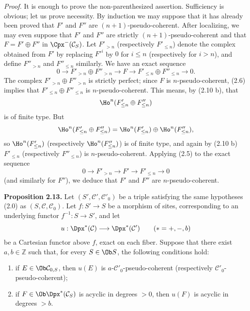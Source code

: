 \documentclass[11pt]{article}
\begin{document}
\emph{Proof.} It is enough to prove the non-parenthesized assertion. Sufficiency is obvious; let us prove necessity. By induction we may suppose that it has already been proved that \(F'\) and \(F''\) are \((n+1)\)-pseudo-coherent. After localizing, we may even suppose that \(F'\) and \(F''\) are strictly \((n+1)\)-pseudo-coherent and that \(F=F'\oplus F''\) in \(\Cpx^-(\mathcal C_S)\). Let \(F'_{>n}\) (respectively \(F'_{\leq n}\)) denote the complex obtained from \(F'\) by replacing \(F'^i\) by \(0\) for \(i\leq n\) (respectively for \(i>n\)), and define \(F''_{>n}\) and \(F''_{\leq n}\) similarly. We have an exact sequence
\[
  0\longrightarrow F'_{>n}\oplus F''_{>n}\longrightarrow F
  \longrightarrow F'_{\leq n}\oplus F''_{\leq n}\longrightarrow 0 .
\]
The complex \(F'_{>n}\oplus F''_{>n}\) is strictly perfect; since \(F\) is \(n\)-pseudo-coherent, (2.6) implies that \(F'_{\leq n}\oplus F''_{\leq n}\) is \(n\)-pseudo-coherent. This means, by (2.10 b), that
\[
  \Ho^n(F'_{\leq n}\oplus F''_{\leq n})
\]
is of finite type. But
\[
  \Ho^n(F'_{\leq n}\oplus F''_{\leq n})
  =\Ho^n(F'_{\leq n})\oplus \Ho^n(F''_{\leq n}),
\]
so \(\Ho^n(F'_{\leq n})\) (respectively \(\Ho^n(F''_{\leq n})\)) is of finite type, and again by (2.10 b) \(F'_{\leq n}\) (respectively \(F''_{\leq n}\)) is \(n\)-pseudo-coherent. Applying (2.5) to the exact sequence
\[
  0\longrightarrow F'_{>n}\longrightarrow F'\longrightarrow F'_{\leq n}\longrightarrow 0
\]
(and similarly for \(F''\)), we deduce that \(F'\) and \(F''\) are \(n\)-pseudo-coherent.

\textbf{Proposition 2.13.} Let \((S',\mathcal C',\mathcal C'_0)\) be a triple satisfying the same hypotheses (2.0) as \((S,\mathcal C,\mathcal C_0)\). Let \(f:S'\to S\) be a morphism of sites, corresponding to an underlying functor \(f^{-1}:S\to S'\), and let
\[
  u:\Dpx^*(\mathcal C)\longrightarrow \Dpx^*(\mathcal C')\qquad (*=+,-,b)
\]
be a Cartesian functor above \(f\), exact on each fiber. Suppose that there exist \(a,b\in\mathbb Z\) such that, for every \(S\in\Ob S\), the following conditions hold:

\begin{enumerate}[label=(\roman*)]
\item if \(E\in\Ob\mathcal C_{0,S}\), then \(u(E)\) is \(a\)-\(\mathcal C'_0\)-pseudo-coherent (respectively \(\mathcal C'_0\)-pseudo-coherent);
\item if \(F\in\Ob\Dpx^*(\mathcal C_S)\) is acyclic in degrees \(>0\), then \(u(F)\) is acyclic in degrees \(>b\).
\end{enumerate}
\end{document}
